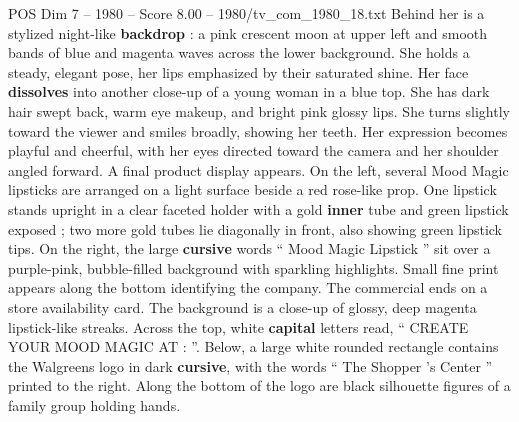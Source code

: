 \begin{textsample}{POS Dim 7 – 1980 – Score 8.00 – 1980/tv\_com\_1980\_18.txt}
Behind her is a stylized night-like \textbf{backdrop} : a pink crescent moon at upper left and smooth bands of blue and magenta waves across the lower background.
She holds a steady, elegant pose, her lips emphasized by their saturated shine.
Her face \textbf{dissolves} into another close-up of a young woman in a blue top.
She has dark hair swept back, warm eye makeup, and bright pink glossy lips.
She turns slightly toward the viewer and smiles broadly, showing her teeth.
Her expression becomes playful and cheerful, with her eyes directed toward the camera and her shoulder angled forward.
A final product display appears.
On the left, several Mood Magic lipsticks are arranged on a light surface beside a red rose-like prop.
One lipstick stands upright in a clear faceted holder with a gold \textbf{inner} tube and green lipstick exposed ; two more gold tubes lie diagonally in front, also showing green lipstick tips.
On the right, the large \textbf{cursive} words “ Mood Magic Lipstick ” sit over a purple-pink, bubble-filled background with sparkling highlights.
Small fine print appears along the bottom identifying the company.
The commercial ends on a store availability card.
The background is a close-up of glossy, deep magenta lipstick-like streaks.
Across the top, white \textbf{capital} letters read, “ CREATE YOUR MOOD MAGIC AT : ”.
Below, a large white rounded rectangle contains the Walgreens logo in dark \textbf{cursive}, with the words “ The Shopper ’s Center ” printed to the right.
Along the bottom of the logo are black silhouette figures of a family group holding hands.

\end{textsample}
